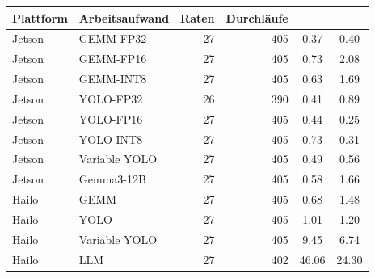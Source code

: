 \begin{tabular}{@{}llrrS[table-format=2.2]S[table-format=2.2]@{}}
\toprule
Plattform & Arbeitsaufwand & Raten & Durchläufe & {} & {} \\
\midrule
Jetson & GEMM-FP32 & 27 & 405 & 0.37 & 0.40 \\
Jetson & GEMM-FP16 & 27 & 405 & 0.73 & 2.08 \\
Jetson & GEMM-INT8 & 27 & 405 & 0.63 & 1.69 \\
Jetson & YOLO-FP32 & 26 & 390 & 0.41 & 0.89 \\
Jetson & YOLO-FP16 & 27 & 405 & 0.44 & 0.25 \\
Jetson & YOLO-INT8 & 27 & 405 & 0.73 & 0.31 \\
Jetson & Variable YOLO & 27 & 405 & 0.49 & 0.56 \\
Jetson & Gemma3-12B & 27 & 405 & 0.58 & 1.66 \\
Hailo & GEMM & 27 & 405 & 0.68 & 1.48 \\
Hailo & YOLO & 27 & 405 & 1.01 & 1.20 \\
Hailo & Variable YOLO & 27 & 405 & 9.45 & 6.74 \\
Hailo & LLM & 27 & 402 & 46.06 & 24.30 \\
\bottomrule
\end{tabular}
